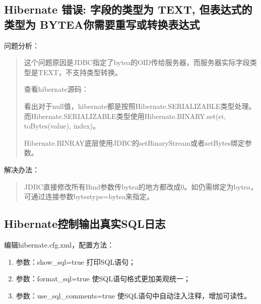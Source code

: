 \documentclass[letterpaper,10pt,english]{sphinxmanual}
\begin{document}
\subsection{Hibernate 错误: 字段的类型为 TEXT, 但表达式的类型为 BYTEA你需要重写或转换表达式}
\label{\detokenize{interface/hibernate:hibernate-text-bytea}}
问题分析：
\begin{quote}

这个问题原因是JDBC指定了bytea的OID传给服务器，而服务器实际字段类型是TEXT，不支持类型转换。

查看hibernate源码：

\begin{sphinxVerbatim}[commandchars=\\\{\}]
           
          
             
\end{sphinxVerbatim}

看出对于null值，hibernate都是按照Hibernate.SERIALIZABLE类型处理。而Hibernate.SERIALIZABLE类型使用Hibernate.BINARY.set(st, toBytes(value), index)。

Hibernate.BINRAY底层使用JDBC的setBinaryStream或者setBytes绑定参数。
\end{quote}

解决办法：
\begin{quote}

JDBC直接修改所有Bind参数传bytea的地方都改成0。如仍需绑定为bytea，可通过连接参数bytestype=bytea来指定。
\end{quote}


\subsection{Hibernate控制输出真实SQL日志}
\label{\detokenize{interface/hibernate:hibernatesql}}
编辑hibernate.cfg.xml，配置方法：
\begin{enumerate}
%
\item {} 
参数：show\_sql=true 打印SQL语句；

\item {} 
参数：format\_sql=true 使SQL语句格式更加美观统一；

\item {} 
参数：use\_sql\_comments=true 使SQL语句中自动注入注释，增加可读性。

\end{enumerate}
\end{document}
